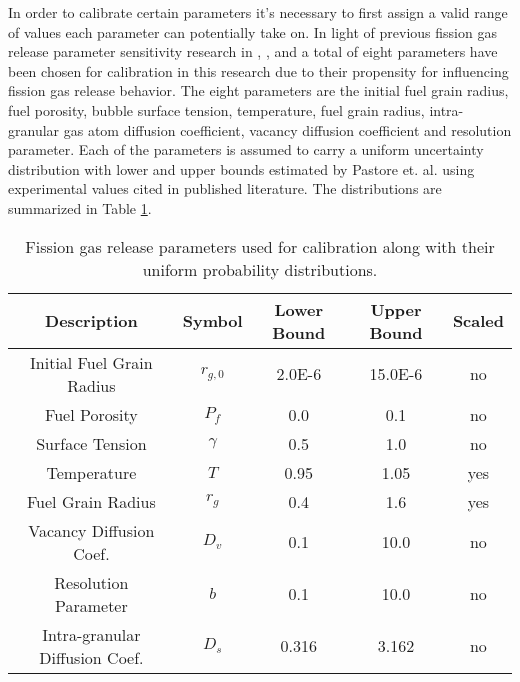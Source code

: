 In order to calibrate certain parameters it's necessary to first assign a valid range of values each parameter can potentially take on. In light of previous fission gas release parameter sensitivity research in \cite{Pastore2}, \cite{Swiler3}, and \cite{Johns} a total of eight parameters have been chosen for calibration in this research due to their propensity for influencing fission gas release behavior. The eight parameters are the initial fuel grain radius, fuel porosity, bubble surface tension, temperature, fuel grain radius, intra-granular gas atom diffusion coefficient, vacancy diffusion coefficient and resolution parameter. Each of the parameters is assumed to carry a uniform uncertainty distribution with lower and upper bounds estimated by Pastore et. al. \cite{Swiler3} \cite{Pastore2} using experimental values cited in published literature. The distributions are summarized in Table \ref{table:fgr_params}.
\begin{table} 
\caption{Fission gas release parameters used for calibration along with their uniform probability distributions.}
\label{table:fgr_params} 
\centering
\begin{tabular}{||c|c|c|c|c||} 
\hline \hline
\textbf{Description} & \textbf{Symbol} & \textbf{Lower Bound} & \textbf{Upper Bound} & \textbf{Scaled} \\ \hline
Initial Fuel Grain Radius & $r_{g,0}$  & 2.0E-6 & 15.0E-6 & no \\ \hline
Fuel Porosity               & $P_f$      & 0.0      & 0.1      & no \\ \hline
Surface Tension           & $\gamma$  & 0.5     & 1.0      & no \\ \hline
Temperature               & $T$          & 0.95   & 1.05     & yes \\ \hline
Fuel Grain Radius         & $r_g$       & 0.4     & 1.6      & yes \\ \hline
Vacancy Diffusion Coef.  & $D_v$      & 0.1      & 10.0     & no \\ \hline
Resolution Parameter    & $b$         & 0.1      & 10.0     & no \\ \hline
Intra-granular Diffusion Coef. & $D_s$ & 0.316 & 3.162   & no \\ 
\hline \hline
\end{tabular}
\end{table}

